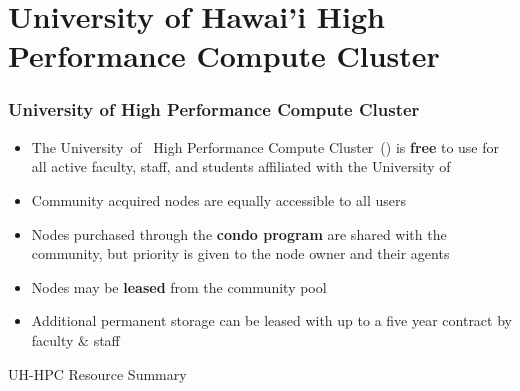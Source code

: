 \section[University of Hawai'i High Performance Compute Cluster]{University of Hawai'i High Performance Compute Cluster}
\begin{frame}
    \frametitle{University of {\hawaii} High Performance Compute Cluster}
    \begin{itemize}
    \item The University~of~{\hawaii} High Performance Compute Cluster~({\uhhpc}) is \textbf{free} to use for all active faculty, staff, and students affiliated with the University of {\hawaii}
    \item Community acquired nodes are equally accessible to all users
    \item Nodes purchased through the {\textbf{condo program}} are shared with the community, but priority is given to the node owner and their agents
		\item Nodes may be {\textbf{leased}} from the community pool
		\item Additional permanent storage can be leased with up to a five year contract by faculty \& staff
    \end{itemize}
		\begin{block}{UH-HPC Resource Summary}
  \begin{table}
    \centering
  \end{table}
	\end{block}
\end{frame}

